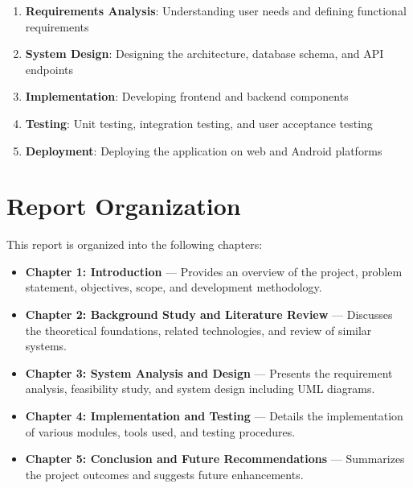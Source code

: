 \begin{enumerate}
    \item \textbf{Requirements Analysis}: Understanding user needs and defining functional requirements
    \item \textbf{System Design}: Designing the architecture, database schema, and API endpoints
    \item \textbf{Implementation}: Developing frontend and backend components
    \item \textbf{Testing}: Unit testing, integration testing, and user acceptance testing
    \item \textbf{Deployment}: Deploying the application on web and Android platforms
\end{enumerate}

\section{Report Organization}

This report is organized into the following chapters:

\begin{itemize}
    \item \textbf{Chapter 1: Introduction} --- Provides an overview of the project, problem statement, objectives, scope, and development methodology.
    
    \item \textbf{Chapter 2: Background Study and Literature Review} --- Discusses the theoretical foundations, related technologies, and review of similar systems.
    
    \item \textbf{Chapter 3: System Analysis and Design} --- Presents the requirement analysis, feasibility study, and system design including UML diagrams.
    
    \item \textbf{Chapter 4: Implementation and Testing} --- Details the implementation of various modules, tools used, and testing procedures.
    
    \item \textbf{Chapter 5: Conclusion and Future Recommendations} --- Summarizes the project outcomes and suggests future enhancements.
\end{itemize}
